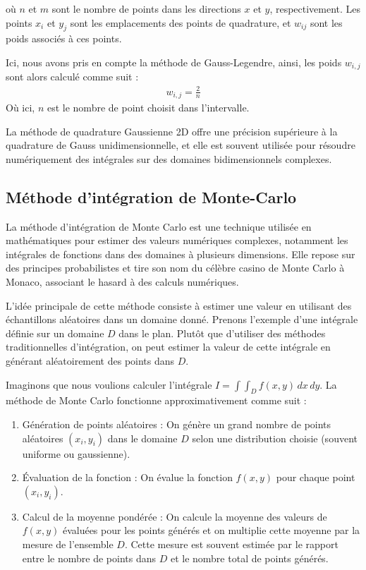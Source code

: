 \documentclass[10pt,a4paper]{article}
\begin{document}
où $n$ et $m$ sont le nombre de points dans les directions $x$ et $y$, respectivement. Les points $x_i$ et $y_j$ sont les emplacements des points de quadrature, et $w_{ij}$ sont les poids associés à ces points.

Ici, nous avons pris en compte la méthode de Gauss-Legendre, ainsi, les poids $w_{i,j}$ sont alors calculé comme suit : 
\begin{align*}
  w_{i,j} =\frac{2}{n}
\end{align*}
Où ici, $n$ est le nombre de point choisit dans l'intervalle.

La méthode de quadrature Gaussienne 2D offre une précision supérieure à la quadrature de Gauss unidimensionnelle, et elle est souvent utilisée pour résoudre numériquement des intégrales sur des domaines bidimensionnels complexes.


\subsection{Méthode d'intégration de Monte-Carlo}

La méthode d'intégration de Monte Carlo est une technique utilisée en mathématiques pour estimer des valeurs numériques complexes, notamment les intégrales de fonctions dans des domaines à plusieurs dimensions. Elle repose sur des principes probabilistes et tire son nom du célèbre casino de Monte Carlo à Monaco, associant le hasard à des calculs numériques.

L'idée principale de cette méthode consiste à estimer une valeur en utilisant des échantillons aléatoires dans un domaine donné. Prenons l'exemple d'une intégrale définie sur un domaine $D$ dans le plan. Plutôt que d'utiliser des méthodes traditionnelles d'intégration, on peut estimer la valeur de cette intégrale en générant aléatoirement des points dans $D$.

Imaginons que nous voulions calculer l'intégrale $I = \int\int_{D} f(x,y) \, dx \, dy$. La méthode de Monte Carlo fonctionne approximativement comme suit :

\begin{enumerate}
    \item Génération de points aléatoires : On génère un grand nombre de points aléatoires $(x_i, y_i)$ dans le domaine $D$ selon une distribution choisie (souvent uniforme ou gaussienne).
    \item Évaluation de la fonction : On évalue la fonction $f(x,y)$ pour chaque point $(x_i, y_i)$.
    \item Calcul de la moyenne pondérée : On calcule la moyenne des valeurs de $f(x,y)$ évaluées pour les points générés et on multiplie cette moyenne par la mesure de l'ensemble $D$. Cette mesure est souvent estimée par le rapport entre le nombre de points dans $D$ et le nombre total de points générés.
\end{enumerate}
\end{document}
